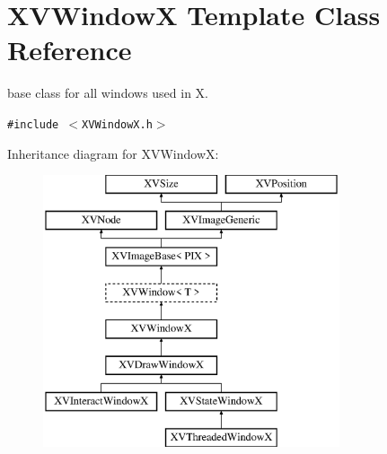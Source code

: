\hypertarget{class_XVWindowX}{
\section{XVWindow\-X  Template Class Reference}
\label{XVWindowX}
}
base class for all windows used in X. 


{\tt \#include $<$XVWindow\-X.h$>$}

Inheritance diagram for XVWindow\-X:\begin{figure}[H]
\begin{center}
\leavevmode
\includegraphics[height=8cm]{class_XVWindowX}
\end{center}
\end{figure}

